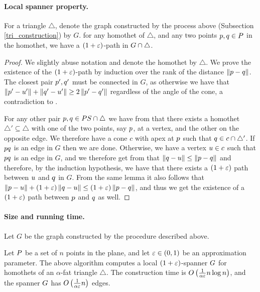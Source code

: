 \documentclass[12pt]{article}%
\begin{document}
\paragraph{Local spanner property.}
\begin{lemma}
	For a triangle $\triangle$, denote the graph constructed by the process above (Subsection \ref{tri_construction}) by $G$. for any homothet of $\triangle$, and any two points $p, q \in P$ in the homothet, we have a $(1+\varepsilon)$-path in
	$G \cap {\triangle}$.
\end{lemma}



\begin{proof}
	We slightly abuse notation and denote the homothet by $\triangle$. We prove the existence of the $(1+\varepsilon)$-path by induction over the rank of the distance $\left\| p - q \right\|$. The closest pair $p',q'$ must be connected in $G$, as otherwise we have that $\left\| p' - u' \right\|+\left\| q' - u' \right\|\geq 2 \left\| p' - q' \right\|$ regardless of the angle of the cone, a contradiction to  .
	
	For any other pair $p,q\in PS\cap \triangle$ we have from  that there exists a homothet $\triangle'\subseteq \triangle$ with one of the two points, say $p$, at a vertex, and the other on the opposite edge. We therefore have a cone $c$ with apex at $p$ such that $q\in c\cap \triangle'$. If $pq$ is an edge in $G$ then we are done. Otherwise, we have a vertex $u\in c$ such that $pq$ is an edge in $G$, and we therefore get from  that $\left\| q - u \right\|\leq \left\| p - q \right\|$ and therefore, by the induction hypothesis, we have that there exists a $(1+\varepsilon)$ path between $u$ and $q$ in $G$. From the same lemma it also follows that $\left\| p - u \right\|+(1+\varepsilon)\left\| q - u \right\|\leq(1+\varepsilon)\left\| p - q \right\|$, and thus we get the existence of a $(1+\varepsilon)$ path between $p$ and $q$ as well.
	
\end{proof}


\paragraph{Size and running time.}
Let $G$ be the graph constructed by the procedure described above.


\begin{theorem}
	Let $P$ be a set of $n$ points in the plane, and let
	$\varepsilon \in (0,1)$ be an approximation parameter. The above
	algorithm computes a local $(1+\varepsilon)$-spanner $G$ for homothets of an $\alpha$-fat triangle $\triangle$.
	The construction time is
	$O\left(\frac{1}{\alpha\varepsilon}n\log n\right)$, and the spanner $G$ has
	$O\left(\frac{1}{\alpha\varepsilon}n\right)$ edges.
\end{theorem}
\end{document}

